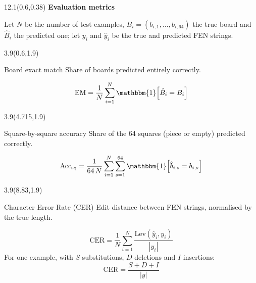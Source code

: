\documentclass{article}
\newcommand{\desc}[1]{{\color{grey}\normalsize #1}\par}
\begin{document}
\begin{textblock}{12.1}(0.6,0.38)
  {\rmfamily\bfseries\fontsize{34}{40}\selectfont Evaluation metrics}\par\vspace{6pt}
  {\color{grey}\fontsize{16}{20}\selectfont
  Let $N$ be the number of test examples, $B_i = (b_{i,1}, \dots, b_{i,64})$ the true board and
  $\hat{B}_i$ the predicted one; let $y_i$ and $\hat{y}_i$ be the true and predicted FEN strings.}
\end{textblock}

\begin{textblock}{3.9}(0.6,1.9)
\begin{metric}[height=2.35in]{Board exact match}
  \desc{Share of boards predicted entirely correctly.}
  \vfill
  \[
  \mathrm{EM} = \frac{1}{N} \sum_{i=1}^{N} \mathbbm{1}\!\left[\hat{B}_i = B_i\right]
  \]
  \vfill
\end{metric}
\end{textblock}

\begin{textblock}{3.9}(4.715,1.9)
\begin{metric}[height=2.35in]{Square-by-square accuracy}
  \desc{Share of the 64 squares (piece or empty) predicted correctly.}
  \vfill
  \[
  \mathrm{Acc}_{\mathrm{sq}} = \frac{1}{64\,N} \sum_{i=1}^{N} \sum_{s=1}^{64}
  \mathbbm{1}\!\left[\hat{b}_{i,s} = b_{i,s}\right]
  \]
  \vfill
\end{metric}
\end{textblock}

\begin{textblock}{3.9}(8.83,1.9)
\begin{metric}[height=2.35in]{Character Error Rate (CER)}
  \desc{Edit distance between FEN strings, normalised by the true length.}
  \vspace{-4pt}
  \[
  \mathrm{CER} = \frac{1}{N} \sum_{i=1}^{N} \frac{\mathrm{Lev}(\hat{y}_i, y_i)}{|y_i|}
  \]
  \vspace{-6pt}
  {\normalsize For one example, with $S$ substitutions, $D$ deletions and $I$ insertions:}
  \vspace{-6pt}
  \[
  \mathrm{CER} = \frac{S + D + I}{|y|}
  \]
\end{metric}
\end{textblock}
\end{document}
